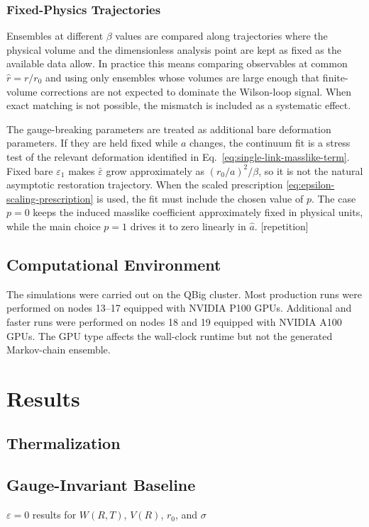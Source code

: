 \documentclass[12pt,a4paper,oneside,numbers=noenddot]{scrreprt}
\newcommand{\eps}{\varepsilon}
\newcommand{\latspacing}{a}
\newcommand{\wilsonloop}{W(R,T)}
\newcommand{\rzero}{r_0}
\newcommand{\stringtension}{\sigma}
\begin{document}
\subsection{Fixed-Physics Trajectories}
Ensembles at different $\beta$ values are compared along trajectories where the
physical volume and the dimensionless analysis point are kept as fixed as the
available data allow. In practice this means comparing observables at common
$\hat r=r/\rzero$ and using only ensembles whose volumes are large enough that
finite-volume corrections are not expected to dominate the Wilson-loop signal.
When exact matching is not possible, the mismatch is included as a systematic
effect.

The gauge-breaking parameters are treated as additional bare deformation
parameters. If they are held fixed while $\latspacing$ changes, the continuum
fit is a stress test of the relevant deformation identified in
Eq.~\eqref{eq:single-link-masslike-term}. Fixed bare $\eps_1$ makes
$\bar\eps$ grow approximately as $(\rzero/\latspacing)^2/\beta$, so it is not
the natural asymptotic restoration trajectory. When the scaled prescription
\eqref{eq:epsilon-scaling-prescription} is used, the fit must include the
chosen value of $p$. The case $p=0$ keeps the induced masslike coefficient
approximately fixed in physical units, while the main choice $p=1$ drives it to
zero linearly in $\hat a$. [repetition]

\section{Computational Environment}
The simulations were carried out on the QBig cluster. Most production runs were
performed on nodes 13--17 equipped with NVIDIA P100 GPUs. Additional and faster
runs were performed on nodes 18 and 19 equipped with NVIDIA A100 GPUs. The GPU
type affects the wall-clock runtime but not the generated Markov-chain ensemble.

\chapter{Results}
\label{chap:results}
\section{Thermalization}

\section{Gauge-Invariant Baseline}
$\eps=0$ results for $\wilsonloop$, $V(R)$, $\rzero$, and $\stringtension$
\end{document}
